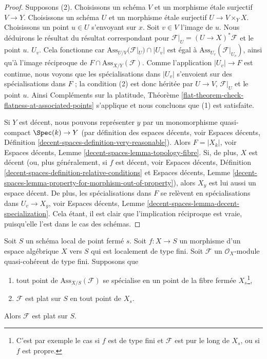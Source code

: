 \begin{proof}
Supposons (2).
Choisissons un schéma $V$ et un morphisme \'etale surjectif $V \to Y$.
Choisissons un schéma $U$ et un morphisme \'etale surjectif $U \to V \times_Y X$.
Choisissons un point $u \in U$ s'envoyant sur $x$. Soit $v \in V$ l'image de $u$.
Nous déduirons le résultat du résultat correspondant pour
$\mathcal{F}|_U = (U \to X)^*\mathcal{F}$ et le point $u$.
$U_v$. Cela fonctionne car $\text{Ass}_{U/V}(\mathcal{F}|_U) \cap |U_v|$
est égal à $\text{Ass}_{U_v}(\mathcal{F}|_{U_v})$, ainsi qu'à l'image
réciproque de $F \cap \text{Ass}_{X/Y}(\mathcal{F})$.
Comme l'application $|U_v| \to F$ est continue, nous voyons que
les spécialisations dans $|U_v|$ s'envoient sur des spécialisations dans $F$ ;
la condition (2) est donc héritée par $U \to V$,
$\mathcal{F}|_U$ et le point $u$.
Ainsi Compléments sur la platitude, Théorème
\ref{flat-theorem-check-flatness-at-associated-points} s'applique
et nous concluons que (1) est satisfaite.

\medskip\noindent
Si $Y$ est décent, nous pouvons représenter
$y$ par un monomorphisme quasi-compact $\Spec(k) \to Y$
(par définition des espaces décents, voir
Espaces décents, Définition \ref{decent-spaces-definition-very-reasonable}).
Alors $F = |X_k|$, voir
Espaces décents, Lemme \ref{decent-spaces-lemma-topology-fibre}.
Si, de plus, $X$ est décent (ou, plus généralement, si $f$ est décent, voir
Espaces décents, Définition \ref{decent-spaces-definition-relative-conditions}
et Espaces décents, Lemme
\ref{decent-spaces-lemma-property-for-morphism-out-of-property}),
alors $X_y$ est lui aussi un espace décent. De plus, les spécialisations dans
$F$ se relèvent en spécialisations
dans $U_v \to X_y$, voir
Espaces décents, Lemme \ref{decent-spaces-lemma-decent-specialization}.
Cela étant, il est clair que l'implication réciproque
est vraie, puisqu'elle l'est dans le cas des schémas.
\end{proof}

\begin{lemma}
\label{lemma-check-along-closed-fibre}
Soit $S$ un schéma local de point fermé $s$.
Soit $f : X \to S$ un morphisme d'un espace algébrique $X$ vers $S$
qui est localement de type fini.
Soit $\mathcal{F}$ un $\mathcal{O}_X$-module quasi-cohérent de type fini.
Supposons que
\begin{enumerate}
\item tout point de $\text{Ass}_{X/S}(\mathcal{F})$ se spécialise
en un point de la fibre fermée $X_s$\footnote{C'est par exemple le cas si
$f$ est de type fini et $\mathcal{F}$ est pur le long de $X_s$, ou
si $f$ est propre.},
\item $\mathcal{F}$ est plat sur $S$ en tout point de $X_s$.
\end{enumerate}
Alors $\mathcal{F}$ est plat sur $S$.
\end{lemma}

